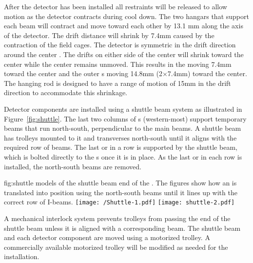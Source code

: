 After the detector has been installed all restraints will be released to allow motion as the detector contracts during cool down.  The two hangars that support each  beam will contract and move toward each other by 13.1 mm along the axis of the detector.  
The drift distance will shrink by 7.4mm caused by the contraction of the field cages.  The detector is symmetric in the drift direction around the center .  The drifts on either side of the center  will  shrink toward the center while the center  remains unmoved.  This results in the  moving 7.4mm toward the center and the outer s moving 14.8mm (2$\times$7.4mm) toward the center.  The hanging rod is designed to have a range of motion of 15mm in the drift direction to accommodate this shrinkage.




Detector components are installed using a shuttle beam system as
illustrated in Figure~\ref{fig:shuttle}.  
The last two columns of
\fdth{}s (western-most) support temporary beams that run
north-south, perpendicular to the main  beams.  
A shuttle beam has trolleys mounted to it and transverses 
north-south until it aligns with the required row of  beams.  
The last  or  in a row is supported by the shuttle beam, which is bolted directly to the \fdth{}s once it is in place.  
As the last  or  in each row is installed, the north-south beams are removed.

\begin{dunefigure}{fig:shuttle}
  {\threed models of the shuttle beam end of the . The figures show how an 
is translated into position using the north-south beams until it lines up with the correct
row of I-beams.}
\texttt{[image: /Shuttle-1.pdf]}
 \texttt{[image: shuttle-2.pdf]}
\end{dunefigure}

A mechanical interlock system  prevents trolleys
from passing the end of the shuttle beam unless it is aligned with a
corresponding  beam.  The shuttle beam and each detector component are
moved using a motorized trolley.  A commercially available motorized
trolley will be modified as needed for the
installation. 




